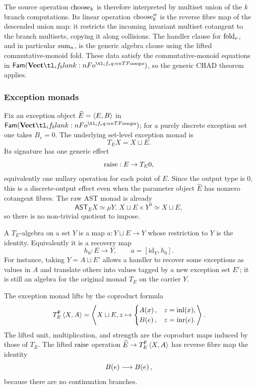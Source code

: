 \documentclass[11pt,a4paper]{article}
\theoremstyle{definition}
\theoremstyle{remark}
\providecommand{\id}{\mathrm{id}}
\providecommand{\AST}{\mathsf{AST}}
\providecommand{\Fam}[1]{\mathsf{Fam}(#1)}
\begin{document}
The source operation \(\opn[b]{choose}_k\) is therefore interpreted by multiset
union of the \(k\) branch computations.  Its linear operation
\(\opn[b]{choose}^{w}_k\) is the reverse fibre map of the descended union map:
it restricts the incoming invariant multiset cotangent to the branch multisets,
copying it along collisions.  The handler clause for
\(\opn[b]{fold}_{\nu}\), and in particular \(\opn[b]{sum}_n\), is the generic
algebra clause using the lifted commutative-monoid fold.  These data satisfy the
commutative-monoid equations in \(\Fam{\Vect[o]}\), so the generic CHAD theorem
applies.

\subsubsection{Exception monads}
\label{sec:appendix-exception-monads}

Fix an exception object \(\widehat E=\left\langle E,B\right\rangle\) in \(\Fam{\Vect[o]}\); for a
purely discrete exception set one takes \(B_e=0\).  The underlying set-level
exception monad is
\[
  T_E X=X\sqcup E .
\]
Its signature has one generic effect
\[
  \opn{raise}:E\to T_E0,
\]
equivalently one nullary operation for each point of \(E\).  Since the output
type is \(0\), this is a discrete-output effect even when the parameter object
\(\widehat E\) has nonzero cotangent fibres.  The raw AST monad is already
\[
  \AST_E X
  \simeq
  \mu Y.\;X\sqcup E\times Y^0
  \simeq
  X\sqcup E,
\]
so there is no non-trivial quotient to impose.

A \(T_E\)-algebra on a set \(Y\) is a map \(a:Y\sqcup E\to Y\) whose restriction
to \(Y\) is the identity.  Equivalently it is a recovery map
\[
  h_0:E\to Y,
  \qquad
  a=[\id_Y,h_0].
\]
For instance, taking \(Y=A\sqcup E'\) allows a handler to recover some
exceptions as values in \(A\) and translate others into values tagged by a new
exception set \(E'\); it is still an algebra for the original monad \(T_E\) on
the carrier \(Y\).

The exception monad lifts by the coproduct formula
\[
  T_E^{\cat[]{F}}\tuple{X,A}
  =
  \tuple{
    X\sqcup E,
    z\mapsto
    \begin{cases}
      \Fun[nn]{A}{x}, & z=\opn{inl}(x),\\
      \Fun[nn]{B}{e}, & z=\opn{inr}(e).
    \end{cases}
  }.
\]
The lifted unit, multiplication, and strength are the coproduct maps induced by
those of \(T_E\).  The lifted \(\opn{raise}\) operation
\(\widehat E\to T_E^{\cat[]{F}}\tuple{X,A}\) has reverse fibre map the identity
\[
  \Fun[nn]{B}{e}\longrightarrow \Fun[nn]{B}{e},
\]
because there are no continuation branches.
\end{document}
